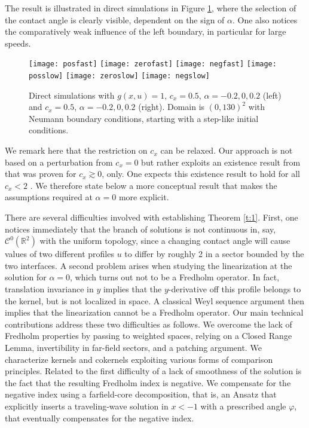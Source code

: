 \documentclass[10pt]{article}
\newcommand{\R}{\mathbb{R}}
\begin{document}
The result is illustrated in direct simulations in Figure \ref{f:10}, where the selection of the contact angle is clearly visible, dependent on the sign of $\alpha$. One also notices the comparatively weak influence of the left boundary, in particular for large speeds. 


\begin{figure}
\texttt{[image: posfast]}\hfill
\texttt{[image: zerofast]}\hfill
\texttt{[image: negfast]}\hfill
\texttt{[image: posslow]}\hfill
\texttt{[image: zeroslow]}\hfill
\texttt{[image: negslow]}
\caption{Direct simulations with $g(x,u)=1$, $c_x=0.5$, $\alpha=-0.2,0,0.2$ (left) and $c_x=0.5$, $\alpha=-0.2,0,0.2$ (right). Domain is $(0,130)^2$ with Neumann boundary conditions, starting with a step-like initial conditions. }
\label{f:10}
\end{figure}

We remark here that the restriction on $c_x$ can be relaxed. Our approach is not based on a perturbation from $c_x=0$ but rather exploits an existence result from \cite{Monteiro_Scheel} that was proven for $c_x\gtrsim 0$, only. One expects this existence result to hold for all $c_x<2$ \cite{Monteiro}. We therefore state below a more conceptual result that makes the assumptions required at $\alpha=0$ more explicit. 

There are several  difficulties involved with establishing Theorem \ref{t:1}. First, one notices immediately that the branch of solutions is not continuous in, say, $\mathcal{C}^0(\R^2)$ with the uniform topology, since a changing contact angle will cause values of two different profiles $u$ to differ by roughly 2 in a sector bounded by the two interfaces. A second problem arises when studying the linearization at the solution for $\alpha=0$, which turns out not to be a Fredholm operator. In fact, translation invariance in $y$ implies that the $y$-derivative off this profile belongs to the kernel, but is not localized in space. A classical Weyl sequence argument then implies that the linearization cannot be a Fredholm operator.  Our main technical contributions address these two difficulties as follows. We overcome the lack of Fredholm properties by passing to weighted spaces, relying on a Closed Range Lemma, invertibility in far-field sectors, and a patching argument. We characterize kernels and cokernels exploiting various forms of comparison principles. Related to the first difficulty of a lack of smoothness of the solution is the fact that the resulting Fredholm index is negative. We compensate for the negative index using a farfield-core decomposition, that is, an Ansatz that explicitly inserts a traveling-wave solution in $x<-1$ with a prescribed angle $\varphi$, that eventually compensates for the negative index. 
\end{document}
